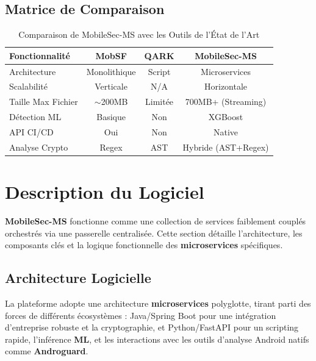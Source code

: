 \documentclass[
  journal=largetwo,
  manuscript=article-type,
  year=2025,
  volume=1,
]{cup-journal}
\begin{document}
\subsection{Matrice de Comparaison}
\begin{table}[hbt!]
\centering
\caption{Comparaison de MobileSec-MS avec les Outils de l'État de l'Art}
\begin{tabular}{p{3cm}ccc}
\toprule
\textbf{Fonctionnalité} & \textbf{MobSF} & \textbf{QARK} & \textbf{MobileSec-MS} \\
\midrule
Architecture & Monolithique & Script & Microservices \\
Scalabilité & Verticale & N/A & Horizontale \\
Taille Max Fichier & $\sim$200MB & Limitée & 700MB+ (Streaming) \\
Détection ML & Basique & Non & XGBoost \\
API CI/CD & Oui & Non & Native \\
Analyse Crypto & Regex & AST & Hybride (AST+Regex) \\
\bottomrule
\end{tabular}
\label{tab:comparison}
\end{table}

\section{Description du Logiciel}
\label{sec:description}

\textbf{MobileSec-MS} fonctionne comme une collection de services faiblement couplés orchestrés via une passerelle centralisée. Cette section détaille l'architecture, les composants clés et la logique fonctionnelle des \textbf{microservices} spécifiques.

\subsection{Architecture Logicielle}
La plateforme adopte une architecture \textbf{microservices} polyglotte, tirant parti des forces de différents écosystèmes : Java/Spring Boot pour une intégration d'entreprise robuste et la cryptographie, et Python/FastAPI pour un scripting rapide, l'inférence \textbf{ML}, et les interactions avec les outils d'analyse Android natifs comme \textbf{Androguard}.
\end{document}
